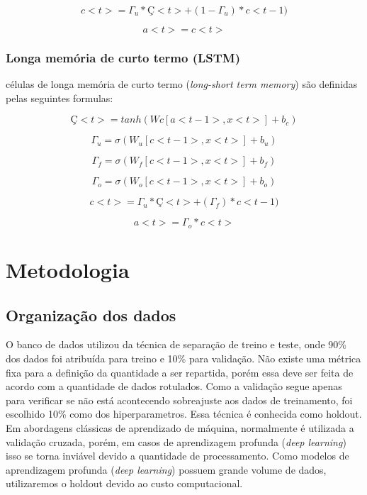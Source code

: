 \documentclass[12pt]{article}
\begin{document}
\begin{equation}
    c<t>=\Gamma_u*Ç<t>+(1-\Gamma_u)*c<t-1)
\end{equation}

\begin{equation}
    a<t>=c<t>
\end{equation}

\subsubsection{Longa memória de curto termo (LSTM)}

células de longa memória de curto termo (\textit{long-short term memory}) são definidas pelas seguintes formulas:

\begin{equation}
    Ç<t> = tanh(Wc[a<t-1>, x<t>]+b_c)
\end{equation}

\begin{equation}
    \Gamma_u = \sigma(W_u[c<t-1>, x<t>]+b_u)
\end{equation}

\begin{equation}
    \Gamma_f = \sigma(W_f[c<t-1>, x<t>]+b_f)
\end{equation}

\begin{equation}
    \Gamma_o = \sigma(W_o[c<t-1>, x<t>]+b_o)
\end{equation}

\begin{equation}
    c<t>=\Gamma_u*Ç<t>+(\Gamma_f)*c<t-1)
\end{equation}

\begin{equation}
    a<t>=\Gamma_o*c<t>
\end{equation}

\section{Metodologia}

\subsection{Organização dos dados}

O banco de dados utilizou da técnica de separação de treino e teste, onde 90\% dos dados foi atribuída para treino e 10\% para validação. Não existe uma métrica fixa para a definição da quantidade a ser repartida, porém essa deve ser feita de acordo com a quantidade de dados rotulados. Como a validação segue apenas para verificar se não está acontecendo sobreajuste aos dados de treinamento, foi escolhido 10\% como dos hiperparametros. Essa técnica é conhecida como holdout. Em abordagens clássicas de aprendizado de máquina, normalmente é utilizada a validação cruzada, porém, em casos de aprendizagem profunda (\textit{deep learning}) isso se torna inviável devido a quantidade de processamento. Como modelos de aprendizagem profunda (\textit{deep learning}) possuem grande volume de dados, utilizaremos o holdout devido ao custo computacional.
\end{document}
